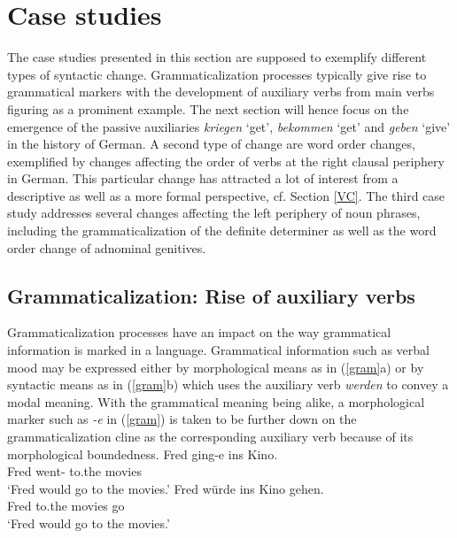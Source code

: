 \documentclass[output=paper
                ,modfonts
                ,nonflat
	        ,collection
	        ,collectionchapter
	        ,collectiontoclongg
 	        ,biblatex
                ,babelshorthands
                ,newtxmath
                ,draftmode
                ,colorlinks, citecolor=brown
]{./langsci/langscibook}
\begin{document}
\section{Case studies}

The case studies presented in this section are supposed to exemplify different types of syntactic change. Grammaticalization processes typically give rise to grammatical markers with the development of auxiliary verbs from main verbs figuring as a prominent example. The next section will hence focus on the emergence of the passive auxiliaries \textit{kriegen} `get', \textit{bekommen} `get' and \textit{geben} `give' in the history of German. A second type of change are word order changes, exemplified by changes affecting the order of verbs at the right clausal periphery in German. This particular change has attracted a lot of interest from a descriptive as well as a more formal perspective, cf. Section \ref{VC}. The third case study addresses several changes affecting the left periphery of noun phrases, including the grammaticalization of the definite determiner as well as the word order change of adnominal genitives. 

\subsection{Grammaticalization: Rise of auxiliary verbs \label{GR}} 

Grammaticalization processes have an impact on the way grammatical information is marked in a language. Grammatical information such as verbal mood may be expressed either by morphological means as in (\ref{gram}a) or by syntactic means as in (\ref{gram}b) which uses the auxiliary verb \textit{werden} to convey a modal meaning. With the grammatical meaning being alike, a morphological marker such as \textit{-e} in (\ref{gram}) is taken to be further down on the grammaticalization cline as the corresponding auxiliary verb because of its morphological boundedness.  
\eal \label{gram}
\ex 
\gll Fred ging-e       ins Kino.\\  
     Fred went-\SBJV{} to.the movies\\  
\glt `Fred would go to the movies.'
\ex
\gll  Fred würde ins Kino gehen.\\ 
      Fred \SBJV{} to.the movies go\\  
\glt `Fred would go to the movies.'
\zl
\end{document}
